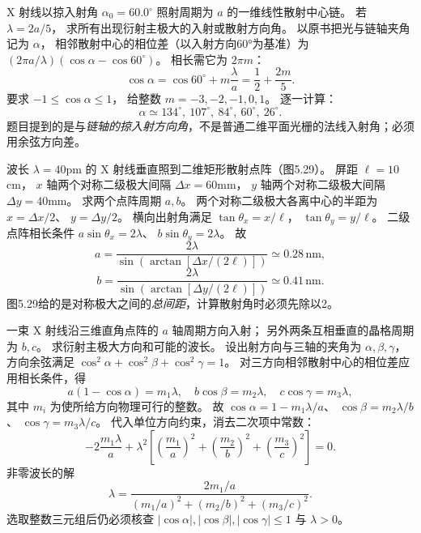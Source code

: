 X 射线以掠入射角
$\alpha_0=60.0^\circ$ 照射周期为 $a$ 的一维线性散射中心链。
若 $\lambda=2a/5$，
求所有出现衍射主极大的入射或散射方向角。
\exsolution
以原书把光与链轴夹角记为 $\alpha$，
相邻散射中心的相位差（以入射方向60°为基准）为
$(2\pi a/\lambda)(\cos\alpha-\cos60^\circ)$。
相长需它为 $2\pi m$：
\[
\boxed{\cos\alpha=\cos60^\circ+m\frac{\lambda}{a}
=\frac12+\frac{2m}{5}}.
\]
要求 $-1\le\cos\alpha\le1$，
给整数
$m=-3,-2,-1,0,1$。
逐一计算：
\[
\boxed{\alpha\simeq
134^\circ,\ 107^\circ,\ 84^\circ,\ 60^\circ,\ 26^\circ}.
\]
\excheck 题目提到的是与\emph{链轴的掠入射方向角}，不是普通二维平面光栅的法线入射角；必须用余弦方向差。

波长
$\lambda=40$pm 的 X 射线垂直照到二维矩形散射点阵（图5.29）。
屏距 $\ell=10$cm，
$x$ 轴两个对称二级极大间隔
$\Delta x=60$mm，
$y$ 轴两个对称二级极大间隔
$\Delta y=40$mm。
求两个点阵周期 $a,b$。
\exsolution
两个对称二级极大各离中心的半距为
$x=\Delta x/2$、
$y=\Delta y/2$。
横向出射角满足
$\tan\theta_x=x/\ell$，
$\tan\theta_y=y/\ell$。
二级点阵相长条件
$a\sin\theta_x=2\lambda$、
$b\sin\theta_y=2\lambda$。
故
\[
\boxed{a=\frac{2\lambda}
{\sin(\arctan[\Delta x/(2\ell)])}
\simeq0.28\,\mathrm{nm}},
\]
\[
\boxed{b=\frac{2\lambda}
{\sin(\arctan[\Delta y/(2\ell)])}
\simeq0.41\,\mathrm{nm}}.
\]
\excheck 图5.29给的是对称极大之间的\emph{总间距}，计算散射角时必须先除以2。

一束 X 射线沿三维直角点阵的 $a$ 轴周期方向入射；
另外两条互相垂直的晶格周期为 $b,c$。
求衍射主极大方向和可能的波长。
\exsolution
设出射方向与三轴的夹角为
$\alpha,\beta,\gamma$，
方向余弦满足
$\cos^2\alpha+\cos^2\beta+\cos^2\gamma=1$。
对三方向相邻散射中心的相位差应用相长条件，得
\[
\boxed{a(1-\cos\alpha)=m_1\lambda},\quad
\boxed{b\cos\beta=m_2\lambda},\quad
\boxed{c\cos\gamma=m_3\lambda},
\]
其中 $m_i$ 为使所给方向物理可行的整数。
故
$\cos\alpha=1-m_1\lambda/a$、
$\cos\beta=m_2\lambda/b$、
$\cos\gamma=m_3\lambda/c$。
代入单位方向约束，消去二次项中常数：
\[
-2\frac{m_1\lambda}{a}
+\lambda^2\left[
\left(\frac{m_1}{a}\right)^2+
\left(\frac{m_2}{b}\right)^2+
\left(\frac{m_3}{c}\right)^2
\right]=0.
\]
非零波长的解
\[
\boxed{\lambda=
\frac{2m_1/a}
{(m_1/a)^2+(m_2/b)^2+(m_3/c)^2}}.
\]
\excheck 选取整数三元组后仍必须核查
$|\cos\alpha|,|\cos\beta|,|\cos\gamma|\le1$ 与 $\lambda>0$。

